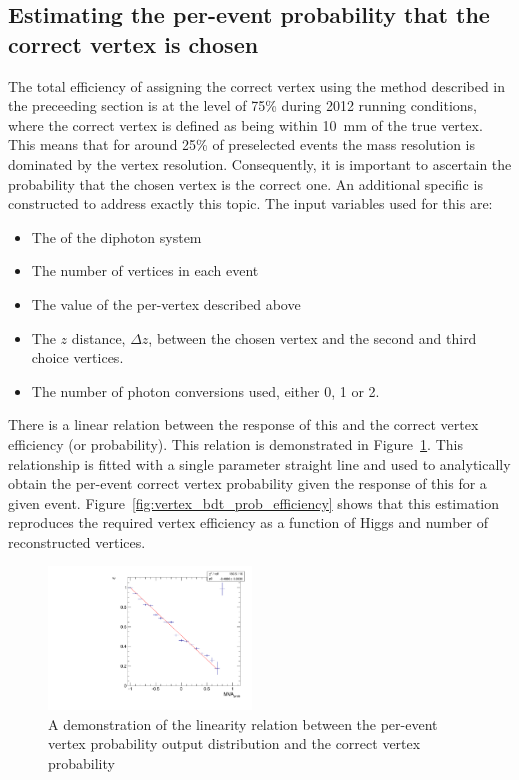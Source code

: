 \subsection{Estimating the per-event probability that the correct vertex is chosen}
\label{sec:bdt_prob}

The total efficiency of assigning the correct vertex using the method described in the preceeding section is at the level of 75\% during 2012 running conditions, where the correct vertex is defined as being within 10~mm of the true vertex. This means that for around 25\% of preselected events the mass resolution is dominated by the vertex resolution. Consequently, it is important to ascertain the probability that the chosen vertex is the correct one. An additional specific \BDT is constructed to address exactly this topic. The input variables used for this \BDT are:

\begin{itemize}
  \item The \pT of the diphoton system
  \item The number of vertices in each event
  \item The value of the per-vertex \BDT described above
  \item The $z$ distance, $\Delta z$, between the chosen vertex and the second and third choice vertices.
  \item The number of photon conversions used, either 0, 1 or 2.
\end{itemize}

There is a linear relation between the response of this \BDT and the correct vertex efficiency (or probability). This relation is demonstrated in Figure~\ref{fig:vertex_bdt_prob}. This relationship is fitted with a single parameter straight line and used to analytically obtain the per-event correct vertex probability given the response of this \BDT for a given event. Figure~\ref{fig:vertex_bdt_prob_efficiency} shows that this estimation reproduces the required vertex efficiency as a function of Higgs \pT and number of reconstructed vertices.

\begin{figure}
  \includegraphics[width=0.48\textwidth]{ch3_comm_anal_comps/plots/vertex_bdt_prob.pdf}
  \caption{A demonstration of the linearity relation between the per-event vertex probability \BDT output distribution and the correct vertex probability}
  \label{fig:vertex_bdt_prob}
\end{figure}

